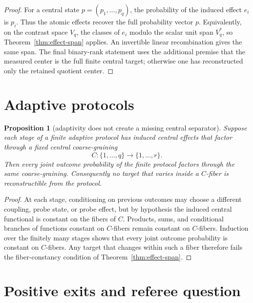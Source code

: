 \documentclass[12pt]{article}
\newtheorem{proposition}{Proposition}
\theoremstyle{remark}
\begin{document}
\begin{proof}
For a central state \(p=(p_1,\ldots,p_q)\), the probability of the induced
effect \(e_i\) is \(p_i\).  Thus the atomic effects recover the full probability
vector \(p\).  Equivalently, on the contrast space \(V_q\), the classes of
\(e_i\) modulo the scalar unit span \(V_q^*\), so
Theorem~\ref{thm:effect-span} applies.  An invertible linear recombination
gives the same span.  The final binary-rank statement uses the additional
premise that the measured center is the full finite central target; otherwise
one has reconstructed only the retained quotient center.
\end{proof}

\section{Adaptive protocols}

\begin{proposition}[adaptivity does not create a missing central separator]
\label{prop:adaptive}
Suppose each stage of a finite adaptive protocol has induced central effects
that factor through a fixed central coarse-graining
\[
  C:\{1,\ldots,q\}\to\{1,\ldots,r\}.
\]
Then every joint outcome probability of the finite protocol factors through
the same coarse-graining.  Consequently no target that varies inside a
\(C\)-fiber is reconstructible from the protocol.
\end{proposition}

\begin{proof}
At each stage, conditioning on previous outcomes may choose a different
coupling, probe state, or probe effect, but by hypothesis the induced central
functional is constant on the fibers of \(C\).  Products, sums, and conditional
branches of functions constant on \(C\)-fibers remain constant on
\(C\)-fibers.  Induction over the finitely many stages shows that every joint
outcome probability is constant on \(C\)-fibers.  Any target that changes
within such a fiber therefore fails the fiber-constancy condition of
Theorem~\ref{thm:effect-span}.
\end{proof}

\section{Positive exits and referee question}
\end{document}
